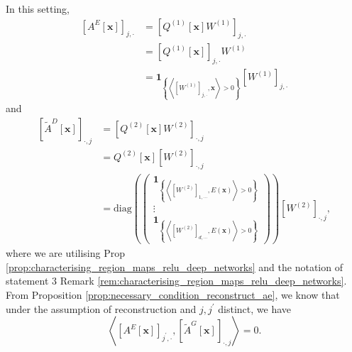 \begin{tproof}
    In this setting, 
    \begin{align*}
        \left[A^E[\mathbf{x}]\right]_{j,\cdot}&=\left[Q^{(1)}[\mathbf{x}]W^{(1)}\right]_{j,\cdot}\\&=\left[Q^{(1)}[\mathbf{x}]\right]_{j,\cdot}W^{(1)}\\&=\mathbf{1}_{\left\{\left\langle\left[W^{(1)}\right]_{j,\cdot},\mathbf{x}\right\rangle>0\right\}}\left[W^{(1)}\right]_{j,\cdot}
    \end{align*}
    and
    \begin{align*}
        \left[\tilde{A}^D[\mathbf{x}]\right]_{\cdot,j}&=\left[Q^{(2)}[\mathbf{x}]W^{(2)}\right]_{\cdot,j}\\&=Q^{(2)}[\mathbf{x}]\left[W^{(2)}\right]_{\cdot,j}\\&=\mathrm{diag}\left(\begin{pmatrix}\mathbf{1}_{\left\{\left\langle\left[W^{(2)}\right]_{1,\cdots},E(\mathbf{x})\right\rangle>0\right\}}\\\vdots\\\mathbf{1}_{\left\{\left\langle\left[W^{(2)}\right]_{d,\cdots},E(\mathbf{x})\right\rangle>0\right\}}\end{pmatrix}\right)\left[W^{(2)}\right]_{\cdot,j},
    \end{align*}
    where we are utilising Prop \ref{prop:characterising_region_maps_relu_deep_networks} and the notation of statement 3 Remark \ref{rem:characterising_region_maps_relu_deep_networks}. From Proposition \ref{prop:necessary_condition_reconstruct_ae}, we know that under the assumption of reconstruction and $j,j^\prime$ distinct, we have 
    \begin{equation}\label{eq:bi_orthogonality_nec_condition}
        \left\langle\left[A^E[\mathbf{x}]\right]_{j^\prime,\cdot},\left[\tilde{A}^G[\mathbf{x}]\right]_{\cdot,j}\right\rangle=0.
    \end{equation}

\end{tproof}
